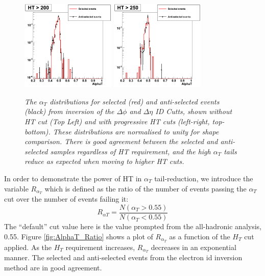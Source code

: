 \documentclass[12pt]{article}
\begin{document}
\begin{figure}[h!]
\includegraphics[width=45mm]{leptonicalphaT/alphat_5}
\hspace*{6mm}
\includegraphics[width=45mm]{leptonicalphaT/alphat_6}
\caption{\textit{The $\alpha_{T}$ distributions for selected (red) and anti-selected events (black) from inversion of the $\Delta \phi$ and $\Delta \eta$ ID Cutts, shown without HT cut (Top Left) and with progressive HT cuts (left-right, top-bottom). These distributions are normalised to unity for shape comparison. There is good agreement between the selected and anti-selected samples regardless of HT requirement, and the high $\alpha_{T}$ tails reduce as expected when moving to higher HT cuts.}}
\label{fig:AlphaTbyHT}
\end{figure}

In order to demonstrate the power of HT in $\alpha_{T}$ tail-reduction, we introduce the variable $R_{\alpha_T}$ which is defined as the ratio of the number of events passing the $\alpha_T$ cut over the number of events failing it:
\begin{equation}
R_{\alpha T} = \frac{N(\alpha_{T}>0.55)}{N(\alpha_{T}<0.55)}
\end{equation}
The ``default'' cut value here is the value prompted from the all-hadronic analysis, 0.55. Figure \ref{fig:AlphaT_Ratio} shows a plot of $R_{\alpha_T}$ as a function of the $H_{T}$ cut applied. As the $H_{T}$ requirement increases, $R_{\alpha_T}$ decreases in an exponential manner. The selected and anti-selected events from the electron id inversion method are in good agreement.
\end{document}
